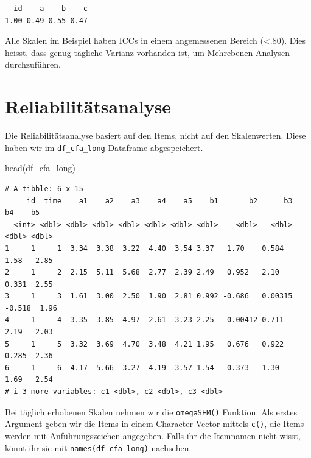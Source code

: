 \documentclass[
  letterpaper,
  DIV=11,
  numbers=noendperiod]{scrreprt}
\newenvironment{Shaded}{\begin{snugshade}}{\end{snugshade}}
\newcommand{\AttributeTok}[1]{\textcolor[rgb]{0.40,0.45,0.13}{#1}}
\newcommand{\FunctionTok}[1]{\textcolor[rgb]{0.28,0.35,0.67}{#1}}
\newcommand{\NormalTok}[1]{\textcolor[rgb]{0.00,0.23,0.31}{#1}}
\newcommand{\OtherTok}[1]{\textcolor[rgb]{0.00,0.23,0.31}{#1}}
\newcommand{\SpecialCharTok}[1]{\textcolor[rgb]{0.37,0.37,0.37}{#1}}
\newcommand{\StringTok}[1]{\textcolor[rgb]{0.13,0.47,0.30}{#1}}
\begin{document}
\begin{verbatim}
  id    a    b    c 
1.00 0.49 0.55 0.47 
\end{verbatim}

Alle Skalen im Beispiel haben ICCs in einem angemessenen Bereich
(\textless.80). Dies heisst, dass genug tägliche Varianz vorhanden ist,
um Mehrebenen-Analysen durchzuführen.

\section{Reliabilitätsanalyse}\label{reliabilituxe4tsanalyse}

Die Reliabilitätsanalyse basiert auf den Items, nicht auf den
Skalenwerten. Diese haben wir im \texttt{df\_cfa\_long} Dataframe
abgespeichert.

\begin{Shaded}
\begin{Highlighting}[]
\FunctionTok{head}\NormalTok{(df\_cfa\_long)}
\end{Highlighting}
\end{Shaded}

\begin{verbatim}
# A tibble: 6 x 15
     id  time    a1    a2    a3    a4    a5    b1       b2      b3     b4    b5
  <int> <dbl> <dbl> <dbl> <dbl> <dbl> <dbl> <dbl>    <dbl>   <dbl>  <dbl> <dbl>
1     1     1  3.34  3.38  3.22  4.40  3.54 3.37   1.70    0.584    1.58   2.85
2     1     2  2.15  5.11  5.68  2.77  2.39 2.49   0.952   2.10     0.331  2.55
3     1     3  1.61  3.00  2.50  1.90  2.81 0.992 -0.686   0.00315 -0.518  1.96
4     1     4  3.35  3.85  4.97  2.61  3.23 2.25   0.00412 0.711    2.19   2.03
5     1     5  3.32  3.69  4.70  3.48  4.21 1.95   0.676   0.922    0.285  2.36
6     1     6  4.17  5.66  3.27  4.19  3.57 1.54  -0.373   1.30     1.69   2.54
# i 3 more variables: c1 <dbl>, c2 <dbl>, c3 <dbl>
\end{verbatim}

Bei täglich erhobenen Skalen nehmen wir die \texttt{omegaSEM()}
Funktion. Als erstes Argument geben wir die Items in einem
Character-Vector mittels \texttt{c()}, die Items werden mit
Anführungszeichen angegeben. Falls ihr die Itemnamen nicht wisst, könnt
ihr sie mit \texttt{names(df\_cfa\_long)} nachsehen.

\begin{Shaded}
\end{Shaded}
\end{document}
